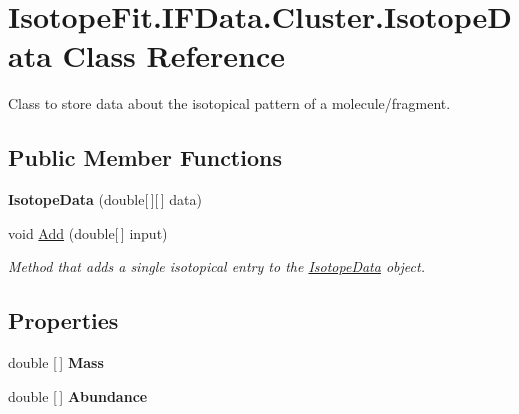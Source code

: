 \hypertarget{class_isotope_fit_1_1_i_f_data_1_1_cluster_1_1_isotope_data}{}\section{Isotope\+Fit.\+I\+F\+Data.\+Cluster.\+Isotope\+Data Class Reference}
\label{class_isotope_fit_1_1_i_f_data_1_1_cluster_1_1_isotope_data}


Class to store data about the isotopical pattern of a molecule/fragment.  


\subsection*{Public Member Functions}
\begin{DoxyCompactItemize}
\item 
\mbox{\label{class_isotope_fit_1_1_i_f_data_1_1_cluster_1_1_isotope_data_aed4fa29e98d7ffdde1a421848b0918f4}} 
{\bfseries Isotope\+Data} (double\mbox{[}$\,$\mbox{]}\mbox{[}$\,$\mbox{]} data)
\item 
void \mbox{\hyperlink{class_isotope_fit_1_1_i_f_data_1_1_cluster_1_1_isotope_data_a6f2c01094e5e4d0f68166664adeedd99}{Add}} (double\mbox{[}$\,$\mbox{]} input)
\begin{DoxyCompactList}\small\item\em Method that adds a single isotopical entry to the \mbox{\hyperlink{class_isotope_fit_1_1_i_f_data_1_1_cluster_1_1_isotope_data}{Isotope\+Data}} object. \end{DoxyCompactList}\end{DoxyCompactItemize}
\subsection*{Properties}
\begin{DoxyCompactItemize}
\item 
\mbox{\label{class_isotope_fit_1_1_i_f_data_1_1_cluster_1_1_isotope_data_afbbe848f60b456135ea622abf0644d1b}} 
double \mbox{[}$\,$\mbox{]} {\bfseries Mass}
\item 
\mbox{\label{class_isotope_fit_1_1_i_f_data_1_1_cluster_1_1_isotope_data_aa0f17487c627ed87bedc9cbd2670fc09}} 
double \mbox{[}$\,$\mbox{]} {\bfseries Abundance}
\end{DoxyCompactItemize}


